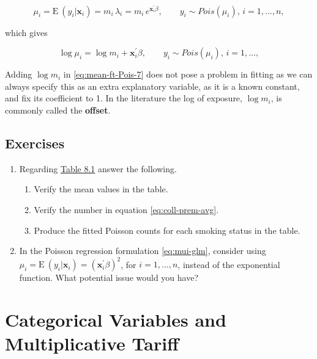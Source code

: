 \documentclass[]{book}
\providecommand{\tightlist}{%
  \setlength{\itemsep}{0pt}\setlength{\parskip}{0pt}}
\theoremstyle{definition}
\theoremstyle{definition}
\theoremstyle{definition}
\theoremstyle{remark}
\begin{document}
\begin{equation}
\mu_i=\mathrm{E~}{(y_i|\mathbf{ x}_i)}=m_i \,\lambda_i=m_i \, e^{\mathbf{ x}^{\prime}_i\beta}, \qquad y_i \sim Pois(\mu_i), \, i=1, \ldots, n,
\label{eq:mean-ft-Pois-6}
\end{equation}

which gives

\begin{equation}
\log \mu_i=\log m_i+\mathbf{ x}^{\prime}_i\beta, \qquad y_i \sim Pois(\mu_i), \, i=1, \ldots,
\label{eq:mean-ft-Pois-7}
\end{equation}

Adding \(\log m_i\) in \eqref{eq:mean-ft-Pois-7} does not pose a problem
in fitting as we can always specify this as an extra explanatory
variable, as it is a known constant, and fix its coefficient to 1. In
the literature the log of exposure, \(\log m_i\), is commonly called the
\textbf{offset}.

\subsection{Exercises}\label{exercises-4}

\begin{enumerate}
\def\labelenumi{\arabic{enumi}.}
\tightlist
\item
  Regarding \protect\hyperlink{tab:8.1}{Table 8.1} answer the following.

  \begin{enumerate}
  \def\labelenumii{(\alph{enumii})}
  \tightlist
  \item
    Verify the mean values in the table.\\
  \item
    Verify the number in equation \eqref{eq:coll-prem-avg}.\\
  \item
    Produce the fitted Poisson counts for each smoking status in the
    table.
  \end{enumerate}
\item
  In the Poisson regression formulation \eqref{eq:mui-glm}, consider using
  \(\mu_i=\mathrm{E~}{(y_i|\mathbf{ x}_i)}=({\mathbf{ x}^{\prime}_i\beta})^2\),
  for \(i=1, \ldots, n\), instead of the exponential function. What
  potential issue would you have?
\end{enumerate}

\section{Categorical Variables and Multiplicative
Tariff}\label{S:CatVarMultiTarriff}
\end{document}
